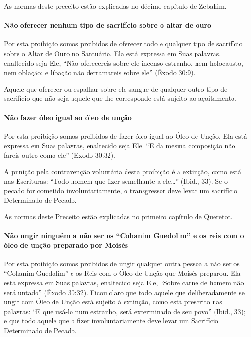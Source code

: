 As normas deste preceito estão explicadas no décimo capítulo de Zebahim.

\paragraph{Não oferecer nenhum tipo de sacrifício sobre o altar de ouro}

Por esta proibição somos proibidos de oferecer todo e qualquer tipo de
sacrifício sobre o Altar de Ouro no Santuário. Ela está expressa em Suas
palavras, enaltecido seja Ele, ``Não oferecereis sobre ele incenso
estranho, nem holocausto, nem oblação; e libação não derramareis sobre
ele'' (Êxodo 30:9).

Aquele que oferecer ou espalhar sobre ele sangue de qualquer outro tipo
de sacrifício que não seja aquele que lhe corresponde está sujeito ao
açoitamento.

\paragraph{Não fazer óleo igual ao óleo de unção}

Por esta proibição somos proibidos de fazer óleo igual ao Óleo de Unção.
Ela está expressa em Suas palavras, enaltecido seja Ele, ``E da mesma
composição não fareis outro como ele'' (Exodo 30:32).

A punição pela contravenção voluntária desta proibição é a extinção,
como está nas Escrituras: ``Todo homem que fizer semelhante a ele\ldots{}''
(Ibid., 33). Se o pecado for cometido involuntariamente, o transgressor
deve levar um sacrifício Determinado de Pecado.

As normas deste Preceito estão explicadas no primeiro capítulo de Queretot.

\paragraph{Não ungir ninguém a não ser os ``Cohanim Guedolim'' e os reis com o óleo de
unção preparado por Moisés}

Por esta proibição somos proibidos de ungir qualquer outra pessoa a não
ser os ``Cohanim Guedolim'' e os Reis com o Óleo de Unção que Moisés
preparou. Ela está expressa em Suas palavras, enaltecido seja Ele,
``Sobre carne de homem não será untado'' (Êxodo 30:32). Ficou claro que
todo aquele que deliberadamente se ungir com Óleo de Unção está sujeito
à extinção, como está prescrito nas palavras: ``E que usá-lo num
estranho, será exterminado de seu povo'' (Ibid., 33); e que todo aquele
que o fizer involuntariamente deve levar um Sacrifício Determinado de
Pecado.

